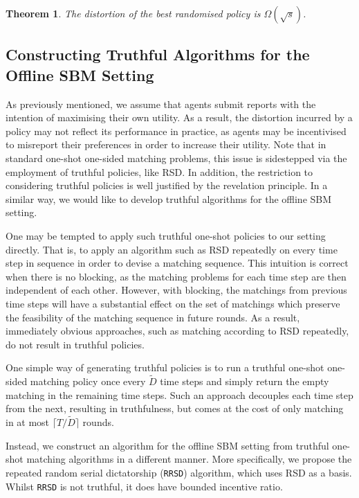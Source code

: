\documentclass[letterpaper,11pt]{article}
\newtheorem{thm}{Theorem}
\begin{document}

\begin{thm}
\label{thm:sqrt distortion}
    The distortion of the best randomised policy is $\Omega(\sqrt{s})$.
\end{thm}

\subsection{Constructing Truthful Algorithms for the Offline SBM Setting}
\label{sec:explain}
As previously mentioned, we assume that agents submit reports with the intention of maximising their own utility. As a result, the distortion incurred by a policy may not reflect its performance in practice, as agents may be incentivised to misreport their preferences in order to increase their utility. Note that in standard one-shot one-sided matching problems, this issue is sidestepped via the employment of truthful policies, like RSD. In addition, the restriction to considering truthful policies is well justified by the revelation principle. In a similar way, we would like to develop truthful algorithms for the offline SBM setting.

One may be tempted to apply such truthful one-shot policies to our setting directly. That is, to apply an algorithm such as RSD repeatedly on every time step in sequence in order to devise a matching sequence. This intuition is correct when there is no blocking, as the matching problems for each time step are then independent of each other. However, with blocking, the matchings from previous time steps will have a substantial effect on the set of matchings which preserve the feasibility of the matching sequence in future rounds. As a result, immediately obvious approaches, such as matching according to RSD repeatedly, do not result in truthful policies.

One simple way of generating truthful policies is to run a truthful one-shot one-sided matching policy once every $\tilde{D}$ time steps and simply return the empty matching in the remaining time steps. Such an approach decouples each time step from the next, resulting in truthfulness, but comes at the cost of only matching in at most $\lceil T/\tilde{D}\rceil$ rounds.

Instead, we construct an algorithm for the offline SBM setting from truthful one-shot matching algorithms in a different manner. More specifically, we propose the repeated random serial dictatorship (\texttt{RRSD}) algorithm, which uses RSD as a basis. Whilst \texttt{RRSD} is not truthful, it does have bounded incentive ratio.
\end{document}
